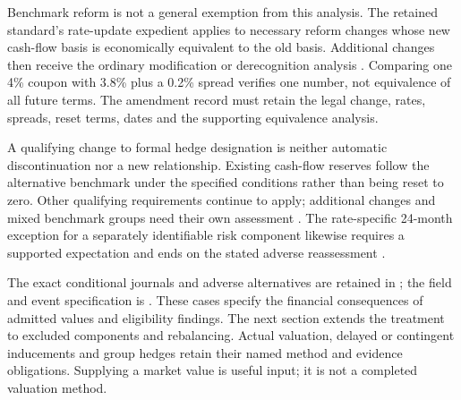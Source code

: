 Benchmark reform is not a general exemption from this analysis. The retained
standard's rate-update expedient applies to necessary reform changes whose
new cash-flow basis is economically equivalent to the old basis. Additional
changes then receive the ordinary modification or derecognition analysis
\citep[5.4.5--9]{aasb9dated}. Comparing one 4\% coupon with 3.8\% plus
a 0.2\% spread verifies one number, not equivalence of all future terms.
The amendment record must retain the legal change, rates, spreads, reset
terms, dates and the supporting equivalence analysis.

A qualifying change to formal hedge designation is neither automatic
discontinuation nor a new relationship. Existing cash-flow reserves follow
the alternative benchmark under the specified conditions rather than being
reset to zero. Other qualifying requirements continue to apply; additional
changes and mixed benchmark groups need their own assessment
\citep[6.9.1--10]{aasb9dated}. The rate-specific 24-month exception for a
separately identifiable risk component likewise requires a supported
expectation and ends on the stated adverse reassessment
\citep[6.9.11--13]{aasb9dated}.

The exact conditional journals and adverse alternatives are retained in
;
the field and event specification is
.
These cases specify the financial consequences of admitted values and
eligibility findings. The next section extends the treatment to excluded
components and rebalancing. Actual valuation, delayed or contingent inducements
and group hedges retain their named method and evidence obligations.
Supplying a market value is useful input; it is not a completed valuation method.
